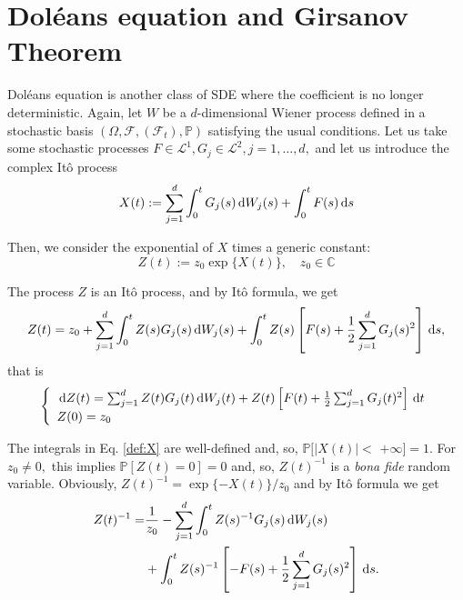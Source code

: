 \section{Doléans equation and Girsanov Theorem}
Doléans equation is another class of SDE where the coefficient is no longer deterministic. Again, let $W$ be a $ d $-dimensional Wiener process defined in a stochastic basis $\left(\Omega, \mathcal{F},\left(\mathcal{F}_{t}\right), \mathbb{P}\right)$ satisfying the usual conditions.
Let us take some stochastic processes $F \in \mathcal{L}^{1}, G_{j} \in \mathcal{L}^{2}, j=1, \ldots, d,$ and let us introduce the complex Itô process
\begin{equation}\label{def:X}
X(t):=\sum_{j=1}^{d} \int_{0}^{t} G_{j}(s) \,\mathrm{d} W_{j}(s)+\int_{0}^{t} F(s) \,\mathrm{d} s
\end{equation}

Then, we consider the exponential of $X$ times a generic constant:
\begin{equation}\label{def:Z}
Z(t):=z_{0} \exp \{X(t)\}, \quad z_{0} \in \mathbb{C}
\end{equation}

The process $Z$ is an Itô process, and by Itô formula, we get  \begin{equation}\label{eq:expression_Z}
Z(t)=z_{0}+\sum_{j=1}^{d} \int_{0}^{t} Z(s) G_{j}(s) \,\mathrm{d} W_{j}(s)+\int_{0}^{t} Z(s)\left[F(s)+\frac{1}{2} \sum_{j=1}^{d} G_{j}(s)^{2}\right] \,\mathrm{d} s,
\end{equation}
that is
\begin{equation}\label{eq:dolean_equation}
\left\{\begin{array}{l}\,\mathrm{d} Z(t)=\sum_{j=1}^{d} Z(t) G_{j}(t) \,\mathrm{d} W_{j}(t)+Z(t)\left[F(t)+\frac{1}{2} \sum_{j=1}^{d} G_{j}(t)^{2}\right] \,\mathrm{d} t \\ Z(0)=z_{0}\end{array}\right.
\end{equation}

The integrals in Eq. \eqref{def:X} are well-defined and, so, $\mathbb{P}[|X(t)|<$ $+\infty]=1 .$ For $z_{0} \neq 0,$ this implies $\mathbb{P}[Z(t)=0]=0$ and, so, $Z(t)^{-1}$ is a \textit{bona fide} random variable. Obviously, $Z(t)^{-1}=\exp \{-X(t)\} / z_{0}$ and by Itô formula we get
\begin{equation}\label{eq:Z^-1}
\begin{aligned} Z(t)^{-1}=& \frac{1}{z_{0}}-\sum_{j=1}^{d} \int_{0}^{t} Z(s)^{-1} G_{j}(s) \,\mathrm{d} W_{j}(s) \\ &+\int_{0}^{t} Z(s)^{-1}\left[-F(s)+\frac{1}{2} \sum_{j=1}^{d} G_{j}(s)^{2}\right] \,\mathrm{d} s . \end{aligned}
\end{equation}

